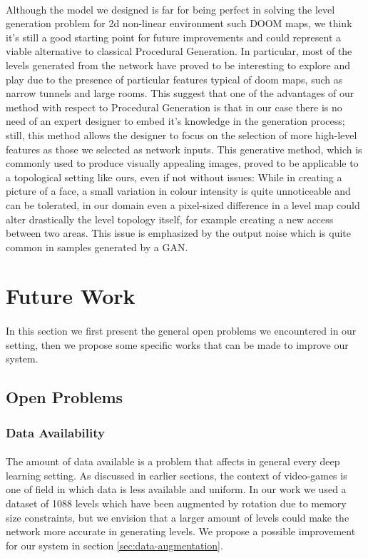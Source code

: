 \paragraph{} Although the model we designed is far for being perfect in solving the level generation problem for 2d non-linear environment such DOOM maps, we think it's still a good starting point for future improvements and could represent a viable alternative to classical Procedural Generation. In particular, most of the levels generated from the network have proved to be interesting to explore and play due to the presence of particular features typical of doom maps, such as narrow tunnels and large rooms. This suggest that one of the advantages of our method with respect to Procedural Generation is that in our case there is no need of an expert designer to embed it's knowledge in the generation process; still, this method allows the designer to focus on the selection of more high-level features as those we selected as network inputs. This generative method, which is commonly used to produce visually appealing images, proved to be applicable to a topological setting like ours, even if not without issues: While in creating a picture of a face, a small variation in colour intensity is quite unnoticeable and can be tolerated, in our domain even a pixel-sized difference in a level map could alter drastically the level topology itself, for example creating a new access between two areas. This issue is emphasized by the output noise which is quite common in samples generated by a GAN.



\section{Future Work}
\label{sec:futurework}
\paragraph{} In this section we first present the general open problems we encountered in our setting, then we propose some specific works that can be made to improve our system.
\subsection{Open Problems}
\subsubsection{Data Availability}
\paragraph{} The amount of data available is a problem that affects in general every deep learning setting. As discussed in earlier sections, the context of video-games is one of field in which data is less available and uniform. In our work we used a dataset of 1088 levels which have been augmented by rotation due to memory size constraints, but we envision that a larger amount of levels could make the network more accurate in generating levels. We propose a possible improvement for our system in section \ref{sec:data-augmentation}.
